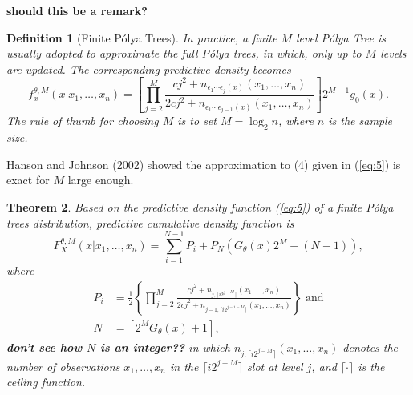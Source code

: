 \documentclass[12pt]{article}
\newtheorem{thm}{Theorem}[subsection]
\newtheorem{deff}[thm]{Definition}
\newcommand{\polya}{P\'{o}lya}
\begin{document}
{\bf should this be a remark?}
\begin{deff}[Finite \polya{} Trees]
In practice, a finite $M$ level \polya{} Tree is usually adopted to
approximate the full \polya{} trees, in which, only up to $M$ levels are
updated. The corresponding predictive density becomes 
\begin{equation}
\label{eq:5}
f_x^{\theta, M} (x|x_1, \ldots, x_n)  =  \left[
  \prod_{j=2}^M \frac{cj^2 + n_{\epsilon_1 \cdots \epsilon_j(x) }(x_1 , \ldots, x_n)}{2cj^2
  + n_{\epsilon_1 \cdots \epsilon_{j-1}(x)}(x_1, \ldots, x_n)}
\right]2^{M-1} g_0(x).
\end{equation}
The rule of thumb for choosing $M$ is to set $M=\log_2n$, where $n$ is
the sample size.
\end{deff}

Hanson and Johnson (2002) showed the approximation to (4) given in
(\ref{eq:5}) is exact for $M$ large enough.

\begin{thm}
Based on the predictive density function (\ref{eq:5}) of a
finite \polya{} trees distribution, 
predictive cumulative density function is 
\begin{equation}
\label{eq:6}
F^{\theta,M}_X(x|x_1, \ldots, x_n) = \sum_{i=1}^{N-1} P_{i} + P_N
\left( G_{\theta}(x)2^M -(N-1) \right),
\end{equation}
where
\begin{align*}
P_i &= \frac{1}{2} \left\{\prod_{j=2}^M \frac{cj^2 + n_{j,\lceil i2^{j-M}
  \rceil}(x_1, \ldots, x_n)}{2cj^2 + n_{j-1,\lceil
  i2^{j-1-M} \rceil}(x_{1 },\ldots, x_n)} \right\} \mbox{ and}\\
N & = \left[ 2^{M } G_{\theta}(x)   +1\right],
\end{align*}
{\bf don't see how $N$ is an integer??}
in which $n_{j,\lceil i2^{j-M}
  \rceil}(x_1, \ldots, x_n)$ denotes the number of observations $x_1,
\ldots, x_n$ in the $\lceil i2^{j-M}
  \rceil$ slot at level $j$, and $\lceil \cdot
  \rceil$ is the ceiling function. 
\end{thm}
\end{document}

